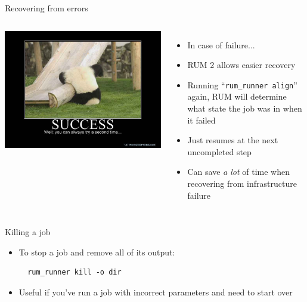 \documentclass{beamer}
\begin{document}
\begin{frame}{Recovering from errors}
  \begin{columns}[c]
    \column{2in}
    \includegraphics[scale=0.2]{success.jpg}
    \column{2.5in}
    \begin{itemize}

    \item In case of failure...

    \item RUM 2 allows easier recovery

    \item Running ``\texttt{rum\_runner align}'' again, RUM will determine what state the job was in when it failed

    \item Just resumes at the next uncompleted step

    \item Can save \textit{a lot} of time when recovering from infrastructure failure

    \end{itemize}

  \end{columns}
\end{frame}

\begin{frame}[fragile]{Killing a job}
\begin{itemize}
\item To stop a job and remove all of its output:
\begin{verbatim}
  rum_runner kill -o dir
\end{verbatim}
\item Useful if you've run a job with incorrect parameters and need to start over
\end{itemize}
\end{frame}
\end{document}
